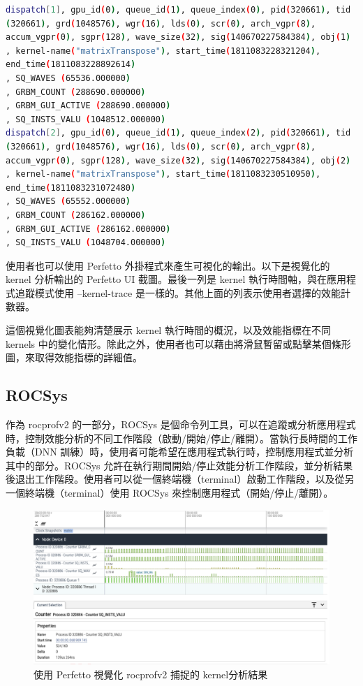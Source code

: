 \begin{lstlisting}[language=bash, caption={rocprofv2 kernel 分析功能的輸出結果}, label={lst:Output of kernel profiling feature of rocprofv2}]
dispatch[1], gpu_id(0), queue_id(1), queue_index(0), pid(320661), tid
(320661), grd(1048576), wgr(16), lds(0), scr(0), arch_vgpr(8),
accum_vgpr(0), sgpr(128), wave_size(32), sig(140670227584384), obj(1)
, kernel-name("matrixTranspose"), start_time(1811083228321204),
end_time(1811083228892614)
, SQ_WAVES (65536.000000)
, GRBM_COUNT (288690.000000)
, GRBM_GUI_ACTIVE (288690.000000)
, SQ_INSTS_VALU (1048512.000000)
dispatch[2], gpu_id(0), queue_id(1), queue_index(2), pid(320661), tid
(320661), grd(1048576), wgr(16), lds(0), scr(0), arch_vgpr(8),
accum_vgpr(0), sgpr(128), wave_size(32), sig(140670227584384), obj(2)
, kernel-name("matrixTranspose"), start_time(1811083230510950),
end_time(1811083231072480)
, SQ_WAVES (65552.000000)
, GRBM_COUNT (286162.000000)
, GRBM_GUI_ACTIVE (286162.000000)
, SQ_INSTS_VALU (1048704.000000)
\end{lstlisting}

使用者也可以使用 Perfetto 外掛程式來產生可視化的輸出。以下是視覺化的 kernel 分析輸出的 Perfetto UI 截圖。最後一列是 kernel 執行時間軸，與在應用程式追蹤模式使用 –kernel-trace 是一樣的。其他上面的列表示使用者選擇的效能計數器。

這個視覺化圖表能夠清楚展示 kernel 執行時間的概況，以及效能指標在不同 kernels 中的變化情形。除此之外，使用者也可以藉由將滑鼠暫留或點擊某個條形圖，來取得效能指標的詳細值。

\subsection{ROCSys}

作為 rocprofv2 的一部分，ROCSys 是個命令列工具，可以在追蹤或分析應用程式時，控制效能分析的不同工作階段（啟動/開始/停止/離開）。當執行長時間的工作負載（DNN 訓練）時，使用者可能希望在應用程式執行時，控制應用程式並分析其中的部分。ROCSys 允許在執行期間開始/停止效能分析工作階段，並分析結果後退出工作階段。使用者可以從一個終端機（terminal）啟動工作階段，以及從另一個終端機（terminal）使用 ROCSys 來控制應用程式（開始/停止/離開）。

\begin{figure}
    \centering
    \includegraphics[width=1\linewidth]{FileAusiliari/Screenshots/Figure7-6.png}
    \caption{使用 Perfetto 視覺化 rocprofv2 捕捉的 kernel分析結果}
    \label{fig:captured kernel profiling results}
\end{figure}

